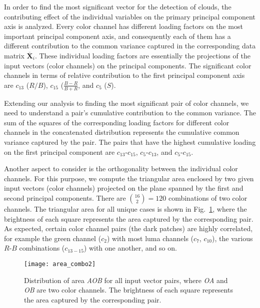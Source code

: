 In order to find the most significant vector for the detection of clouds, the contributing effect of the individual variables on the primary principal component axis is analyzed. Every  color channel has different loading factors on the most important principal component axis, and consequently each of them has a different contribution to the common variance captured in the corresponding data matrix $\ddot{\textbf{X}_{i}}$. These individual loading factors are essentially the projections of the input vectors (color channels) on the principal components. The significant color channels in terms of relative contribution to the first principal component axis are $c_{13}$ ($R/B$), $c_{15}$ ($\frac{B-R}{B+R}$, and $c_{5}$ ($S$).

Extending our analysis to finding the most significant pair of color channels, we need to understand a pair's cumulative contribution to the common variance. The sum of the squares of the corresponding loading factors for different color channels in the concatenated distribution represents the cumulative common variance captured by the pair. The pairs that have the highest cumulative loading on the first principal component are $c_{13}$-$c_{15}$, $c_{5}$-$c_{13}$, and $c_{5}$-$c_{15}$.

Another aspect to consider is the orthogonality between the individual color channels. For this purpose, we compute the triangular area enclosed by two given input vectors (color channels) projected on the plane spanned by the first and second principal components. There are ${{16}\choose{2}}=120$ combinations of two color channels. The triangular area for all unique cases is shown in Fig.~\ref{fig:area_grid_v7}, where the brightness of each square represents the area captured by the corresponding pair.  As expected, certain color channel pairs (the dark patches) are highly correlated, for example the green channel ($c_2$) with most luma channels ($c_7$, $c_{10}$), the various $R$-$B$ combinations ($c_{13-15}$) with one another, and so on.

\begin{figure}[htbp]
\centering
\texttt{[image: area\_combo2]}
\caption[Distribution of triangular area enclosed by two given color channels projected on the plane spanned by the first and second principal components.]{Distribution of area \emph{AOB} for all input vector pairs, where \emph{OA} and \emph{OB} are two color channels. The brightness of each square represents the area captured by the corresponding pair.}
\label{fig:area_grid_v7}
\end{figure}


